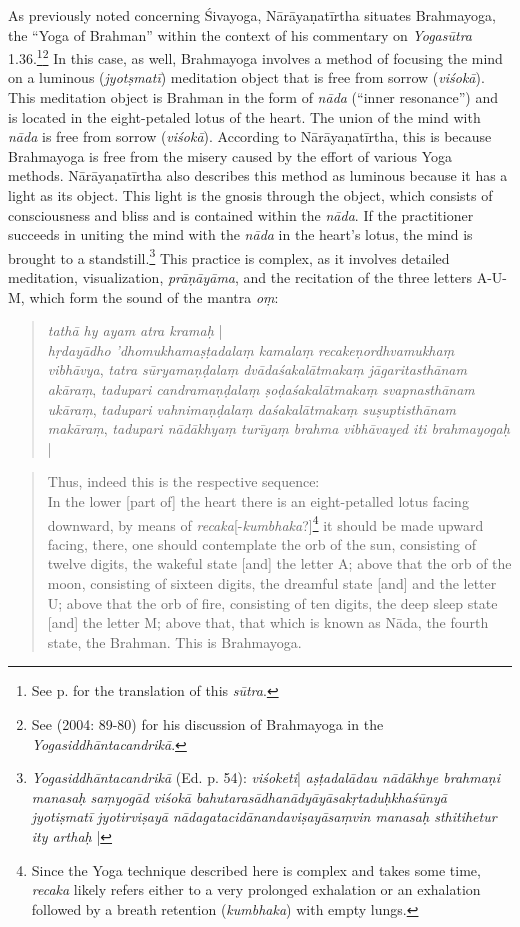 As previously noted concerning Śivayoga, Nārāyaṇatīrtha situates Brahmayoga, the ``Yoga of Brahman'' within the context of his commentary on \textit{Yogasūtra} 1.36.\footnote{See p. \pageref{sivayogacandri} for the translation of this \textit{sūtra}.}\footnote{See \citeauthor{penna2004} (2004: 89-80) for his discussion of Brahmayoga in the \textit{Yogasiddhāntacandrikā}.} In this case, as well, Brahmayoga involves a method of focusing the mind on a luminous (\textit{jyotṣmatī}) meditation object that is free from sorrow (\textit{viśokā}). This meditation object is Brahman in the form of \textit{nāda} (``inner resonance'') and is located in the eight-petaled lotus of the heart. The union of the mind with \textit{nāda} is free from sorrow (\textit{viśokā}). According to Nārāyaṇatīrtha, this is because Brahmayoga is free from the misery caused by the effort of various Yoga methods. Nārāyaṇatīrtha also describes this method as luminous because it has a light as its object. This light is the gnosis through the object, which consists of consciousness and bliss and is contained within the \textit{nāda}. If the practitioner succeeds in uniting the mind with the \textit{nāda} in the heart's lotus, the mind is brought to a standstill.\footnote{\textit{Yogasiddhāntacandrikā} (Ed. p. 54): \textit{viśoketi}| \textit{aṣṭadalādau nādākhye brahmaṇi manasaḥ saṃyogād viśokā bahutarasādhanādyāyāsakṛtaduḥkhaśūnyā jyotiṣmatī jyotirviṣayā nādagatacidānandaviṣayāsaṃvin manasaḥ sthitihetur ity arthaḥ} |}
This practice is complex, as it involves detailed meditation, visualization, \textit{prāṇāyāma}, and the recitation of the three letters A-U-M, which form the sound of the mantra \textit{oṃ}:

\begin{quote}
\textit{tathā hy ayam atra kramaḥ} |\\ \textit{hṛdayādho 'dhomukhamaṣṭadalaṃ kamalaṃ recakeṇordhvamukhaṃ vibhāvya}, \textit{tatra sūryamaṇḍalaṃ dvādaśakalātmakaṃ jāgaritasthānam akāraṃ},
\textit{tadupari candramaṇḍalaṃ ṣoḍaśakalātmakaṃ svapnasthānam ukāraṃ}, \textit{tadupari vahnimaṇḍalaṃ daśakalātmakaṃ suṣuptisthānam makāraṃ}, \textit{tadupari nādākhyaṃ turīyaṃ brahma vibhāvayed iti brahmayogaḥ} |
\end{quote}
\begin{quote}
Thus, indeed this is the respective sequence: \\
In the lower [part of] the heart there is an eight-petalled lotus facing downward, by means of \textit{recaka}[-\textit{kumbhaka}?]\footnote{Since the Yoga technique described here is complex and takes some time, \textit{recaka} likely refers either to a very prolonged exhalation or an exhalation followed by a breath retention (\textit{kumbhaka}) with empty lungs.} it should be made upward facing, there, one should contemplate the orb of the sun, consisting of twelve digits, the wakeful state [and] the letter A; above that the orb of the moon, consisting of sixteen digits, the dreamful state [and] and the letter U; above that the orb of fire, consisting of ten digits, the deep sleep state [and] the letter M; above that, that which is known as Nāda, the fourth state, the Brahman. This is Brahmayoga. 
\end{quote}

